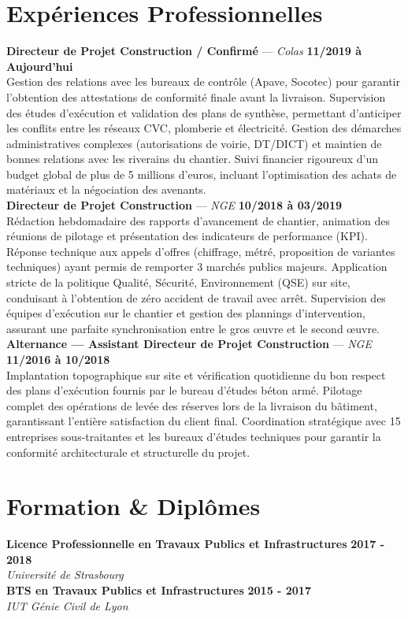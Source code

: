 \documentclass[11pt,a4paper]{article}
\begin{document}
\section*{Expériences Professionnelles}
\noindent \textbf{Directeur de Projet Construction / Confirmé} --- \textit{Colas} \hfill \textbf{11/2019 à Aujourd'hui} \\
Gestion des relations avec les bureaux de contrôle (Apave, Socotec) pour garantir l'obtention des attestations de conformité finale avant la livraison. Supervision des études d'exécution et validation des plans de synthèse, permettant d'anticiper les conflits entre les réseaux CVC, plomberie et électricité. Gestion des démarches administratives complexes (autorisations de voirie, DT/DICT) et maintien de bonnes relations avec les riverains du chantier. Suivi financier rigoureux d'un budget global de plus de 5 millions d'euros, incluant l'optimisation des achats de matériaux et la négociation des avenants. \\[0.3cm]
\noindent \textbf{Directeur de Projet Construction} --- \textit{NGE} \hfill \textbf{10/2018 à 03/2019} \\
Rédaction hebdomadaire des rapports d'avancement de chantier, animation des réunions de pilotage et présentation des indicateurs de performance (KPI). Réponse technique aux appels d'offres (chiffrage, métré, proposition de variantes techniques) ayant permis de remporter 3 marchés publics majeurs. Application stricte de la politique Qualité, Sécurité, Environnement (QSE) sur site, conduisant à l'obtention de zéro accident de travail avec arrêt. Supervision des équipes d'exécution sur le chantier et gestion des plannings d'intervention, assurant une parfaite synchronisation entre le gros œuvre et le second œuvre. \\[0.3cm]
\noindent \textbf{Alternance — Assistant Directeur de Projet Construction} --- \textit{NGE} \hfill \textbf{11/2016 à 10/2018} \\
Implantation topographique sur site et vérification quotidienne du bon respect des plans d'exécution fournis par le bureau d'études béton armé. Pilotage complet des opérations de levée des réserves lors de la livraison du bâtiment, garantissant l'entière satisfaction du client final. Coordination stratégique avec 15 entreprises sous-traitantes et les bureaux d'études techniques pour garantir la conformité architecturale et structurelle du projet. \\[0.3cm]


\vspace{0.3cm}

\section*{Formation \& Diplômes}
\noindent \textbf{Licence Professionnelle en Travaux Publics et Infrastructures} \hfill \textbf{2017 - 2018} \\
\textit{Université de Strasbourg} \\[0.3cm]
\noindent \textbf{BTS en Travaux Publics et Infrastructures} \hfill \textbf{2015 - 2017} \\
\textit{IUT Génie Civil de Lyon} \\[0.3cm]
\end{document}
